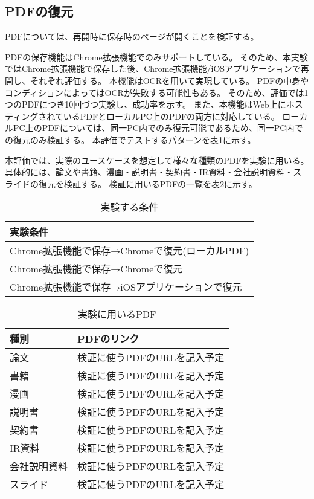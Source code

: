 \subsection{PDFの復元}
PDFについては、再開時に保存時のページが開くことを検証する。

PDFの保存機能はChrome拡張機能でのみサポートしている。
そのため、本実験ではChrome拡張機能で保存した後、Chrome拡張機能/iOSアプリケーションで再開し、それぞれ評価する。
本機能はOCRを用いて実現している。
PDFの中身やコンディションによってはOCRが失敗する可能性もある。
そのため、評価では1つのPDFにつき10回づつ実験し、成功率を示す。
また、本機能はWeb上にホスティングされているPDFとローカルPC上のPDFの両方に対応している。
ローカルPC上のPDFについては、同一PC内でのみ復元可能であるため、同一PC内での復元のみ検証する。
本評価でテストするパターンを表\ref{tb:evl-pdf-conditions}に示す。

本評価では、実際のユースケースを想定して様々な種類のPDFを実験に用いる。
具体的には、論文や書籍、漫画・説明書・契約書・IR資料・会社説明資料・スライドの復元を検証する。
検証に用いるPDFの一覧を表\ref{tb:evl-pdf-list}に示す。

\begin{table}[htbp]
  \label{tb:evl-pdf-conditions}
  \caption{実験する条件}
  \begin{center}
    \begin{tabular}{|l|}
    \hline
    実験条件  \\ \hline
    Chrome拡張機能で保存→Chromeで復元(ローカルPDF) \\ \hline
    Chrome拡張機能で保存→Chromeで復元 \\ \hline
    Chrome拡張機能で保存→iOSアプリケーションで復元 \\ \hline
    \end{tabular}
  \end{center}
\end{table}

\begin{table}[htbp]
  \label{tb:evl-pdf-list}
  \caption{実験に用いるPDF}
  \begin{center}
    \begin{tabular}{|l|l|}
    \hline
    種別 & PDFのリンク  \\ \hline
    論文 & 検証に使うPDFのURLを記入予定  \\ \hline
    書籍 & 検証に使うPDFのURLを記入予定  \\ \hline
    漫画 & 検証に使うPDFのURLを記入予定  \\ \hline
    説明書 & 検証に使うPDFのURLを記入予定  \\ \hline
    契約書 & 検証に使うPDFのURLを記入予定  \\ \hline
    IR資料 & 検証に使うPDFのURLを記入予定  \\ \hline
    会社説明資料 & 検証に使うPDFのURLを記入予定  \\ \hline
    スライド & 検証に使うPDFのURLを記入予定  \\ \hline
    \end{tabular}
  \end{center}
\end{table}
